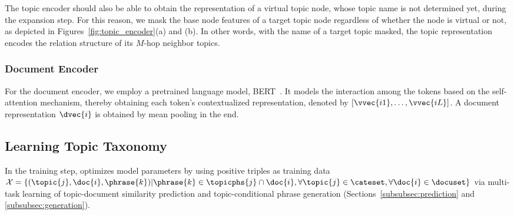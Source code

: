 The topic encoder should also be able to obtain the representation of a virtual topic node, whose topic name is not determined yet, during the expansion step. 
For this reason, we mask the base node features of a target topic node regardless of whether the node is virtual or not, as depicted in Figures~\ref{fig:topic_encoder}(a) and (b).
In other words, with the name of a target topic masked, the topic representation encodes the relation structure of its $M$-hop neighbor topics.

\subsubsection{Document Encoder}
\label{subsubsec:document_encoder}
For the document encoder, we employ a pretrained language model, BERT~\cite{devlin2019bert}.
It models the interaction among the tokens based on the self-attention mechanism, thereby obtaining each token's contextualized representation, denoted by $[\vvec{i1},\ldots,\vvec{iL}]$.
A document representation $\dvec{i}$ is obtained by mean pooling in the end. 

\subsection{Learning Topic Taxonomy}
\label{subsec:training}
In the training step, \proposed optimizes model parameters by using positive triples as training data $\mathcal{X}=\{(\topic{j}, \doc{i}, \phrase{k})|\phrase{k}\in\topicphs{j}\cap\doc{i}, \forall \topic{j}\in\cateset, \forall\doc{i}\in\docuset\}$ 
via multi-task learning of {topic-document similarity prediction} and {topic-conditional phrase generation} (Sections~\ref{subsubsec:prediction} and \ref{subsubsec:generation}).

